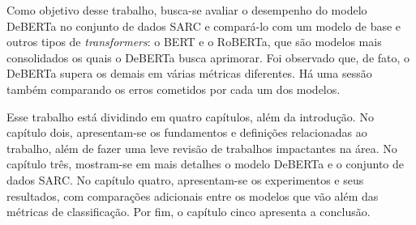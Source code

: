 Como objetivo desse trabalho, busca-se avaliar o desempenho do modelo DeBERTa no
conjunto de dados SARC e compará-lo com um modelo de base e outros tipos de
\textit{transformers}: o BERT e o RoBERTa, que são modelos mais consolidados os
quais o DeBERTa busca aprimorar. Foi observado que, de fato, o DeBERTa supera
os demais em várias métricas diferentes. Há uma sessão também comparando os
erros cometidos por cada um dos modelos.

Esse trabalho está dividindo em quatro capítulos, além da introdução. No
capítulo dois, apresentam-se os fundamentos e definições relacionadas ao
trabalho, além de fazer uma leve revisão de trabalhos impactantes na área. No
capítulo três, mostram-se em mais detalhes o modelo DeBERTa e o conjunto de dados
SARC. No capítulo quatro, apresentam-se os experimentos e seus resultados, com
comparações adicionais entre os modelos que vão além das métricas de
classificação. Por fim, o capítulo cinco apresenta a conclusão.

























